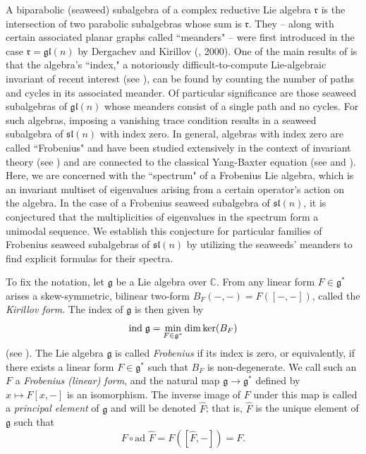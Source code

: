 \documentclass[letterpaper,10pt]{article}
\newcommand{\ind}{{\rm ind \hspace{.1cm}}}
\begin{document}
A biparabolic (seaweed) subalgebra of a complex reductive Lie algebra $\mathfrak{r}$ is the intersection of two parabolic subalgebras whose sum is $\mathfrak{r}$. They -- along with certain associated planar graphs called  ``meanders" -- were first introduced in the case $\mathfrak{r}=\mathfrak{gl}(n)$ by Dergachev and Kirillov (\textbf{\cite{DK}}, 2000). One of the main results of \textbf{\cite{DK}} is that the algebra's ``index," a notoriously difficult-to-compute Lie-algebraic invariant of recent interest (see \textbf{\cite{seriesA,BCD,Panov,Pancent}}), can be found by counting the number of paths and cycles in its associated meander. Of particular significance are those seaweed subalgebras of $\mathfrak{gl}(n)$ whose meanders consist of a single path and no cycles. For such algebras, imposing a vanishing trace condition results in a seaweed subalgebra of $\mathfrak{sl}(n)$ with index zero. In general, algebras with index zero are called ``Frobenius" and have been studied extensively in the context of invariant theory (see \textbf{\cite{Ooms1}}) and are connected to the classical Yang-Baxter equation (see \textbf{\cite{GG1}} and \textbf{\cite{GG2}}). Here, we are concerned with the ``spectrum" of a Frobenius Lie algebra, which is an invariant multiset of eigenvalues arising from a certain operator's action on the algebra. In the case of a Frobenius seaweed subalgebra of $\mathfrak{sl}(n)$, it is conjectured that the multiplicities of eigenvalues in the spectrum form a unimodal sequence. We establish this conjecture for particular families of Frobenius seaweed subalgebras of $\mathfrak{sl}(n)$ by utilizing the seaweeds' meanders to find explicit formulas for their spectra.
\bigskip

To fix the notation, let $\mathfrak{g}$ be a Lie algebra over $\mathbb{C}$. From any linear form $F\in\mathfrak{g}^*$ arises a skew-symmetric, bilinear two-form $B_F(-,-)=F([-,-])$, called the \textit{Kirillov form}. The index of $\mathfrak{g}$ is then given by $$\ind\mathfrak{g}=\min_{F\in\mathfrak{g}^*}\dim\ker(B_F)$$
(see \textbf{\cite{Dix}}). The Lie algebra $\mathfrak{g}$ is called \textit{Frobenius} if its index is zero, or equivalently, if there exists a linear form $F\in\mathfrak{g}^*$ such that $B_F$ is non-degenerate. We call such an $F$ a \textit{Frobenius \textup(linear\textup) form}, and the natural map $\mathfrak{g}\to\mathfrak{g}^*$ defined by $x\mapsto F[x,-]$ is an isomorphism. The inverse image of $F$ under this map is called a \textit{principal element} of $\mathfrak{g}$ and will be denoted $\widehat{F}$; that is, $\widehat{F}$ is the unique element of $\mathfrak{g}$ such that $$F\circ\text{ad }\widehat{F}=F([\widehat{F},-])=F.$$ 
\end{document}
